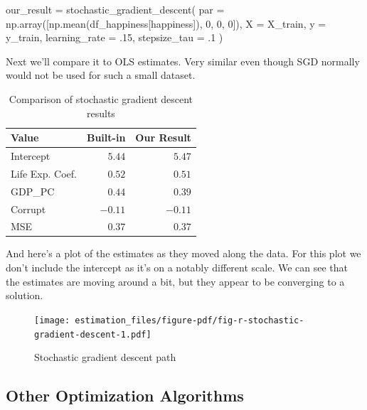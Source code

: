 \documentclass[
  letterpaper,
]{krantz}
\newenvironment{Shaded}{}{}
\newcommand{\DecValTok}[1]{\textcolor[rgb]{0.25,0.63,0.44}{#1}}
\newcommand{\FloatTok}[1]{\textcolor[rgb]{0.25,0.63,0.44}{#1}}
\newcommand{\NormalTok}[1]{#1}
\newcommand{\OperatorTok}[1]{\textcolor[rgb]{0.40,0.40,0.40}{#1}}
\newcommand{\StringTok}[1]{\textcolor[rgb]{0.25,0.44,0.63}{#1}}
\begin{document}
\begin{Shaded}
\begin{Highlighting}[]
\NormalTok{our\_result }\OperatorTok{=}\NormalTok{ stochastic\_gradient\_descent(}
\NormalTok{    par }\OperatorTok{=}\NormalTok{ np.array([np.mean(df\_happiness[}\StringTok{\textquotesingle{}happiness\textquotesingle{}}\NormalTok{]), }\DecValTok{0}\NormalTok{, }\DecValTok{0}\NormalTok{, }\DecValTok{0}\NormalTok{]),}
\NormalTok{    X }\OperatorTok{=}\NormalTok{ X\_train,}
\NormalTok{    y }\OperatorTok{=}\NormalTok{ y\_train,}
\NormalTok{    learning\_rate }\OperatorTok{=} \FloatTok{.15}\NormalTok{,}
\NormalTok{    stepsize\_tau }\OperatorTok{=} \FloatTok{.1}
\NormalTok{)}
\end{Highlighting}
\end{Shaded}

Next we'll compare it to OLS estimates. Very similar even though SGD
normally would not be used for such a small dataset.

\hypertarget{tbl-stochastic-gradient-descent}{}
\begin{longtable}{lrr}
\caption{\label{tbl-stochastic-gradient-descent}Comparison of stochastic gradient descent results }\tabularnewline

\toprule
Value & Built-in & Our Result \\ 
\midrule
Intercept & $5.44$ & $5.47$ \\ 
Life Exp. Coef. & $0.52$ & $0.51$ \\ 
GDP\_PC & $0.44$ & $0.39$ \\ 
Corrupt & $-0.11$ & $-0.11$ \\ 
MSE & $0.37$ & $0.37$ \\ 
\bottomrule
\end{longtable}

And here's a plot of the estimates as they moved along the data. For
this plot we don't include the intercept as it's on a notably different
scale. We can see that the estimates are moving around a bit, but they
appear to be converging to a solution.

\begin{figure}

{\centering \texttt{[image: estimation\_files/figure-pdf/fig-r-stochastic-gradient-descent-1.pdf]}

}

\caption{\label{fig-r-stochastic-gradient-descent}Stochastic gradient
descent path}

\end{figure}

\subsection{Other Optimization
Algorithms}\label{other-optimization-algorithms}
\end{document}
